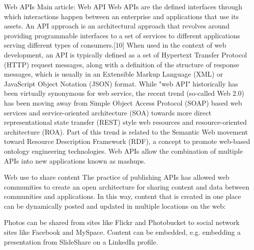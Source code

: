 Web APIs
Main article: Web API
Web APIs are the defined interfaces through which interactions happen between an enterprise and applications that use its assets.
An API approach is an architectural approach that revolves around providing programmable interfaces to a set of services to different applications serving different types of consumers.[10] When used in the context of web development, an API is typically defined as a set of Hypertext Transfer Protocol (HTTP) request messages, along with a definition of the structure of response messages, which is usually in an Extensible Markup Language (XML) or JavaScript Object Notation (JSON) format. 
While "web API" historically has been virtually synonymous for web service, the recent trend (so-called Web 2.0) has been moving away from Simple Object Access Protocol (SOAP) based web services and service-oriented architecture (SOA) towards more direct representational state transfer (REST) style web resources and resource-oriented architecture (ROA).
 Part of this trend is related to the Semantic Web movement toward Resource Description Framework (RDF), a concept to promote web-based ontology engineering technologies. Web APIs allow the combination of multiple APIs into new applications known as mashups.

Web use to share content
The practice of publishing APIs has allowed web communities to create an open architecture for sharing content and data between communities and applications. 
In this way, content that is created in one place can be dynamically posted and updated in multiple locations on the web:

Photos can be shared from sites like Flickr and Photobucket to social network sites like Facebook and MySpace.
Content can be embedded, e.g. embedding a presentation from SlideShare on a LinkedIn profile.

